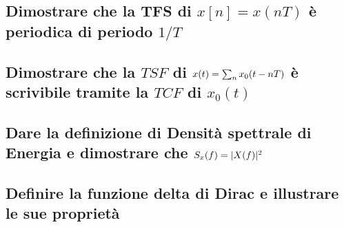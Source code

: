 \documentclass[12pt,oneside,openany]{memoir}
\numberwithin{equation}{subsection}
\DeclarePairedDelimiter{\abs}{\lvert}{\rvert}
\begin{document}

\subsection{Dimostrare che la TFS di $x[n] = x(nT)$ \`e periodica di periodo
$1/T$}


\subsection{Dimostrare che la $TSF$ di $x(t) = \sum\displaylimits_{n}
x_0(t - nT)$ \`e scrivibile tramite la $TCF$ di $x_0(t)$}


\subsection{Dare la definizione di Densit\`a spettrale di Energia e dimostrare
che $S_x(f) = \abs{X(f)}^2$}


\subsection{Definire la funzione delta di Dirac e illustrare le sue propriet\`a}

\end{document}
